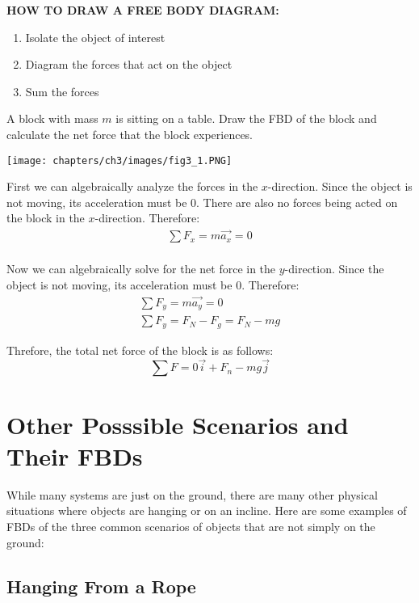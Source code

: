 \begin{center}\textbf{HOW TO DRAW A FREE BODY DIAGRAM:}\end{center}
\begin{enumerate}
	\item Isolate the object of interest
	\item Diagram the forces that act on the object
	\item Sum the forces
\end{enumerate}
\newpage

\begin{problem}
	A block with mass $m$ is sitting on a table. Draw the FBD of the block and calculate the net force that the block experiences.

	\begin{center}
		\texttt{[image: chapters/ch3/images/fig3\_1.PNG]}
	\end{center}
	First we can algebraically analyze the forces in the $x$-direction. Since the object is not moving, its acceleration must be 0. There are also no forces being acted on the block in the $x$-direction. Therefore:
	$$
		\begin{aligned}
			\sum F_x = m\vec{a_x} = 0\\
		\end{aligned}
	$$

	Now we can algebraically solve for the net force in the $y$-direction. Since the object is not moving, its acceleration must be 0. Therefore:
	$$
		\begin{aligned}
			\sum F_y = m\vec{a_y} = 0\\
			\sum F_y = F_N - F_g = F_N - mg
		\end{aligned}
	$$

	Threfore, the total net force of the block is as follows:
	$$
		\sum F = 0\vec{i} + F_n-mg \vec{j}
	$$
\end{problem}


\section{Other Posssible Scenarios and Their FBDs}

While many systems are just on the ground, there are many other physical situations where objects are hanging or on an incline. Here are some examples of FBDs of the three common scenarios of objects that are not simply on the ground:

\subsection*{Hanging From a Rope}

